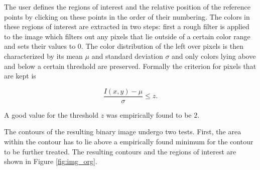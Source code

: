 The user defines the regions of interest and the relative position of the reference points by clicking on these points in the order of their numbering.
The colors in these regions of interest are extracted in two steps: first a rough filter is applied to the image which filters out any pixels that lie outside of a certain color range and sets their values to 0.
The color distribution of the left over pixels is then characterized by its mean $\mu$ and standard deviation $\sigma$ and only colors lying above and below a certain threshold are preserved. Formally the criterion for pixels that are kept is

\begin{equation}
    \frac{I(x,y)-\mu}{\sigma}\leq z.
\end{equation}

A good value for the threshold $z$ was empirically found to be 2.

The contours of the resulting binary image undergo two tests. 
First, the area within the contour has to lie above a empirically found minimum for the contour to be further treated. The resulting contours and the regions of interest are shown in Figure \ref{fig:img_org}. 

